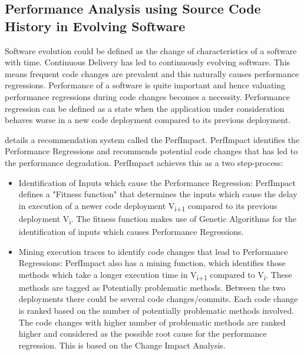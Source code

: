 \documentclass[article,type=msc,colorback,12pt,accentcolor=tud7b]{tudthesis}
\begin{document}
	\subsection{Performance Analysis using Source Code History in Evolving Software}
	
	 Software evolution could be defined as the change of characteristics of a software with time. Continuous Delivery has led to continuously evolving software. This means frequent code changes are prevalent and this naturally causes performance regressions. Performance of a software is quite important and hence valuating performance regressions during code changes becomes a necessity. Performance regression can be defined as a state when the application under consideration behaves worse in a new code deployment compared to its previous deployment. 
	 
	 \cite{luomining} details a recommendation system called the PerfImpact. PerfImpact identifies the Performance Regressions and recommends potential code changes that has led to the performance degradation. PerfImpact achieves this as a two step-process: 
	 
	 \begin{itemize}
\item{Identification of Inputs which cause the Performance Regression:} 
\newline
PerfImpact defines a "Fitness function" that determines the inputs which cause the delay in execution of a newer code deployment V\textsubscript{i+1} compared to its previous deployment V\textsubscript{i}. The fitness function makes use of Genetic Algorithms for the identification of inputs which causes Performance Regressions. 
 
\item {Mining execution traces to identify code changes that lead to Performance Regressions:} 
\newline
PerfImpact also has a mining function, which identifies those methods which take a longer execution time in V\textsubscript{i+1} compared to V\textsubscript{i}. These methods are tagged as Potentially problematic methods. Between the two deployments there could be several code changes/commits. Each code change is ranked based on the number of potentially problematic methods involved. The code changes with higher number of problematic methods are ranked higher and considered as the possible root cause for the performance regression. This is based on the Change Impact Analysis. 	 
	 
	 \end{itemize}
	
\end{document}
